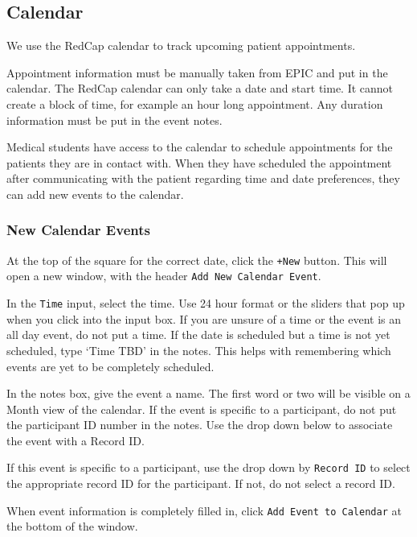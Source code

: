 \documentclass[
]{book}
\begin{document}
\hypertarget{RedCap-Calendar}{%
\subsection{Calendar}\label{RedCap-Calendar}}

We use the RedCap calendar to track upcoming patient appointments.

Appointment information must be manually taken from EPIC and put in the calendar.
The RedCap calendar can only take a date and start time. It cannot create a block of time, for example an hour long appointment. Any duration information must be put in the event notes.

Medical students have access to the calendar to schedule appointments for the patients they are in contact with. When they have scheduled the appointment after communicating with the patient regarding time and date preferences, they can add new events to the calendar.

\hypertarget{RedCap-NewCalendarEvent}{%
\subsubsection{New Calendar Events}\label{RedCap-NewCalendarEvent}}

At the top of the square for the correct date, click the \texttt{+New} button. This will open a new window, with the header \texttt{Add\ New\ Calendar\ Event}.

In the \texttt{Time} input, select the time. Use 24 hour format or the sliders that pop up when you click into the input box. If you are unsure of a time or the event is an all day event, do not put a time. If the date is scheduled but a time is not yet scheduled, type `Time TBD' in the notes. This helps with remembering which events are yet to be completely scheduled.

In the notes box, give the event a name. The first word or two will be visible on a Month view of the calendar. If the event is specific to a participant, do not put the participant ID number in the notes. Use the drop down below to associate the event with a Record ID.

If this event is specific to a participant, use the drop down by \texttt{Record\ ID} to select the appropriate record ID for the participant. If not, do not select a record ID.

When event information is completely filled in, click \texttt{Add\ Event\ to\ Calendar} at the bottom of the window.
\end{document}
